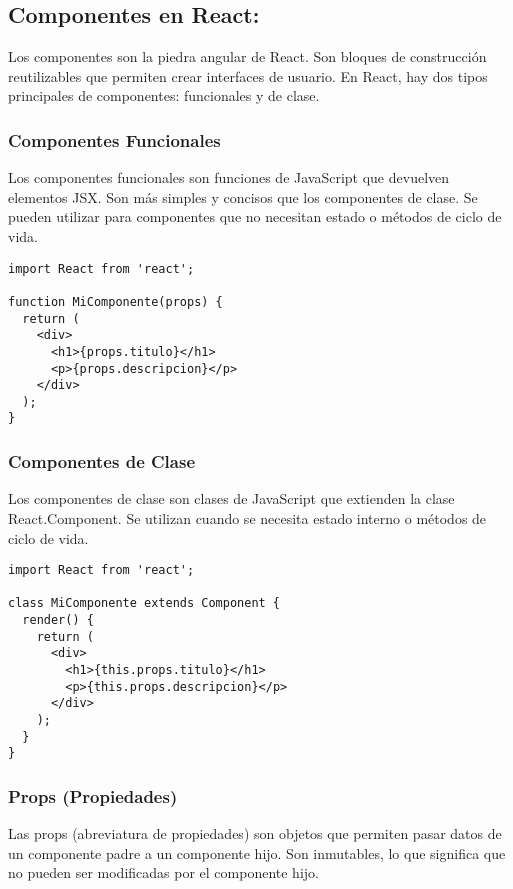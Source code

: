 \documentclass[executivepaper]{article}
\begin{document}
\subsection{Componentes en React:}

Los componentes son la piedra angular de React. Son bloques de construcción reutilizables que permiten crear interfaces de usuario. En React, hay dos tipos principales de componentes: funcionales y de clase.

\subsubsection*{Componentes Funcionales}

Los componentes funcionales son funciones de JavaScript que devuelven elementos JSX. Son más simples y concisos que los componentes de clase. Se pueden utilizar para componentes que no necesitan estado o métodos de ciclo de vida.

\begin{lstlisting}
import React from 'react';

function MiComponente(props) {
  return (
    <div>
      <h1>{props.titulo}</h1>
      <p>{props.descripcion}</p>
    </div>
  );
}
\end{lstlisting}

\subsubsection*{Componentes de Clase}

Los componentes de clase son clases de JavaScript que extienden la clase React.Component. Se utilizan cuando se necesita estado interno o métodos de ciclo de vida.

\begin{lstlisting}
import React from 'react';

class MiComponente extends Component {
  render() {
    return (
      <div>
        <h1>{this.props.titulo}</h1>
        <p>{this.props.descripcion}</p>
      </div>
    );
  }
}
\end{lstlisting}

\subsubsection*{Props (Propiedades)}

Las props (abreviatura de propiedades) son objetos que permiten pasar datos de un componente padre a un componente hijo. Son inmutables, lo que significa que no pueden ser modificadas por el componente hijo.
\end{document}
